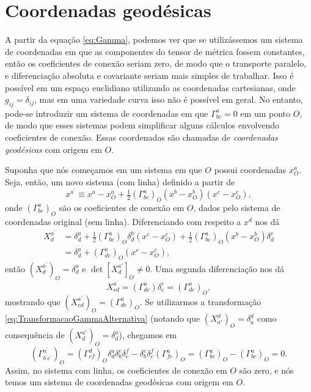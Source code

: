 \section{Coordenadas geodésicas}\label{sec:CoordenadasGeodesicas}

A partir da equação \eqref{eq:Gamma}, podemos ver que se utilizássemos um sistema de coordenadas em que as componentes do tensor de métrica fossem constantes, então os coeficientes de conexão seriam zero, de modo que o transporte paralelo, e diferenciação absoluta e covariante seriam mais simples de trabalhar. Isso é possível em um espaço euclidiano utilizando as coordenadas cartesianas, onde $g_{ij}=\delta_{ij}$, mas em uma variedade curva isso não é possível em geral. No entanto, pode-se introduzir um sistema de coordenadas em que $\Gamma^a_{bc}=0$ em um ponto $O$, de modo que esses sistemas podem simplificar alguns cálculos envolvendo coeficientes de conexão. Essas coordenadas são chamadas de \textit{coordenadas geodésicas} com origem em $O$.

Suponha que nós começamos em um sistema em que $O$ possui coordenadas $x^a_O$. Seja, então, um novo sistema (com linha) definido a partir de
\[
	x^{a^\prime}\equiv x^a - x^a_O + \tfrac{1}{2}(\Gamma^a_{bc})_O (x^b-x^b_O)(x^c-x^c_O) 	,
\]
onde $(\Gamma^a_{bc})_O $ são os coeficientes de conexão em $O$, dados pelo sistema de coordenadas original (sem linha). Diferenciando com respeito a $x^d$ nos dá
\[
\begin{aligned} X_{d}^{a^{\prime}} &=\delta_{d}^{a}+\tfrac{1}{2}\left(\Gamma_{b c}^{a}\right)_{O} \delta_{d}^{b}\left(x^{c}-x_{O}^{c}\right)+\frac{1}{2}\left(\Gamma_{b c}^{a}\right)_{O}\left(x^{b}-x_{O}^{b}\right) \delta_{d}^{c} \\ &=\delta_{d}^{a}+\left(\Gamma_{d c}^{a}\right)_{O}\left(x^{c}-x_{O}^{c}\right) ,
\end{aligned}
\]
então $(X^{a^\prime}_d)_O=\delta^a_d$ e $\det[X^{a\prime}_d]_O\neq0$. Uma segunda diferenciação nos dá
\[
X^{a^\prime}_{ed} = (\Gamma^a_{dc})\delta^c_e = (\Gamma^a_{de})_O,
\]
mostrando que $(X^{a^\prime}_{ed})_O=(\Gamma^a_{de})_O$. Se utilizarmos a transformação \eqref{eq:TransformacaoGammaAlternativa} (notando que $(X^d_{a'})_O=\delta^d_a$ como consequência de $(X^{a'}_d)_O=\delta^a_d$), chegamos em
\[
	\left(\Gamma_{b^{\prime} c^{\prime}}^{a^{\prime}}\right)_{O}=\left(\Gamma_{e f}^{d}\right)_{O} \delta_{d}^{a} \delta_{b}^{e} \delta_{c}^{f}-\delta_{b}^{e} \delta_{c}^{f}\left(\Gamma_{f e}^{a}\right)_{O}=\left(\Gamma_{b c}^{a}\right)_{O}-\left(\Gamma_{b c}^{a}\right)_{O}=0 .
\]
Assim, no sistema com linha, os coeficientes de conexão em $O$ são zero, e nós temos um sistema de coordenadas geodésicas com origem em $O$.

